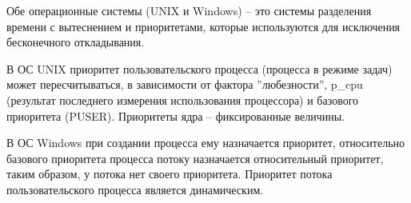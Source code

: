 \documentclass[a4paper,14pt,russian]{extreport}
\begin{document}
	Обе операционные системы (UNIX и Windows) – это системы разделения времени с вытеснением и приоритетами, которые используются для исключения бесконечного откладывания.
		
	В ОС UNIX приоритет пользовательского процесса (процесса в режиме задач) может пересчитываться, в зависимости от фактора ”любезности”, p\_cpu (результат последнего измерения использования процессора) и базового приоритета (PUSER).
	Приоритеты ядра – фиксированные величины.
	
	В ОС Windows при создании процесса ему назначается приоритет, относительно базового приоритета процесса потоку назначается относительный приоритет, таким образом, у потока нет своего приоритета.
	Приоритет потока пользовательского процесса является динамическим.
	
\end{document}
